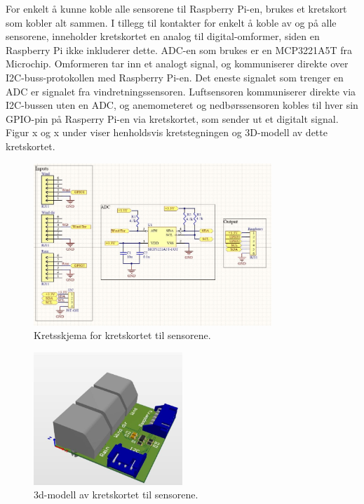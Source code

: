 For enkelt å kunne koble alle sensorene til Raspberry Pi-en, brukes et kretskort som kobler alt sammen. I tillegg til kontakter for enkelt å koble av og på alle sensorene, inneholder kretskortet en analog til digital-omformer, siden en Raspberry Pi ikke inkluderer dette. ADC-en som brukes er en MCP3221A5T fra Microchip. Omformeren tar inn et analogt signal, og kommuniserer direkte over I2C-buss-protokollen med Raspberry Pi-en. Det eneste signalet som trenger en ADC er signalet fra vindretningssensoren. Luftsensoren kommuniserer direkte via I2C-bussen uten en ADC, og anemometeret og nedbørssensoren kobles til hver sin GPIO-pin på Rasperry Pi-en via kretskortet, som sender ut et digitalt signal. Figur x og x under viser henholdsvis kretstegningen og 3D-modell av dette kretskortet.

\begin{figure}[H]
    \centering
    \includegraphics[width=0.8\textwidth]{implementering/sensorkretskort_krets.png}
    \caption{Kretsskjema for kretskortet til sensorene.}
    \label{fig:sensorkretskort_krets}
\end{figure}

\begin{figure}[H]
    \centering
    \includegraphics[width=0.5\textwidth]{implementering/sensorkretskort_3d.png}
    \caption{3d-modell av kretskortet til sensorene.}
    \label{fig:sensorkretskort_3d}
\end{figure}


